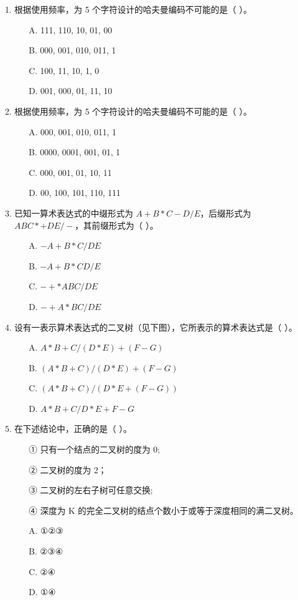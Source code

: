 \documentclass[12pt, a4paper]{article}
\begin{document}
\begin{enumerate}
    \item 根据使用频率，为 5 个字符设计的哈夫曼编码不可能的是（ ）。
    \begin{enumerate}
        \item[A.] 111, 110, 10, 01, 00
        \item[B.] 000, 001, 010, 011, 1
        \item[C.] 100, 11, 10, 1, 0
        \item[D.] 001, 000, 01, 11, 10
    \end{enumerate}
    
    \item 根据使用频率，为 5 个字符设计的哈夫曼编码不可能的是（ ）。
    \begin{enumerate}
        \item[A.] 000, 001, 010, 011, 1
        \item[B.] 0000, 0001, 001, 01, 1
        \item[C.] 000, 001, 01, 10, 11
        \item[D.] 00, 100, 101, 110, 111
    \end{enumerate}
    
    \item 已知一算术表达式的中缀形式为 $A+B*C-D/E$，后缀形式为 $ABC*+DE/-$，其前缀形式为（ ）。
    \begin{enumerate}
        \item[A.] $-A+B*C/DE$
        \item[B.] $-A+B*CD/E$
        \item[C.] $-+*ABC/DE$
        \item[D.] $-+A*BC/DE$
    \end{enumerate}
    
    \item 设有一表示算术表达式的二叉树（见下图），它所表示的算术表达式是（ ）。
    \begin{enumerate}
        \item[A.] $A*B+C/(D*E)+(F-G)$
        \item[B.] $(A*B+C)/(D*E)+(F-G)$
        \item[C.] $(A*B+C)/(D*E+(F-G))$
        \item[D.] $A*B+C/D*E+F-G$
    \end{enumerate}
    
    \item 在下述结论中，正确的是（ ）。
    \begin{enumerate}
        \item[①] 只有一个结点的二叉树的度为 0;
        \item[②] 二叉树的度为 2；
        \item[③] 二叉树的左右子树可任意交换;
        \item[④] 深度为 K 的完全二叉树的结点个数小于或等于深度相同的满二叉树。
        \item[A.] ①②③
        \item[B.] ②③④
        \item[C.] ②④
        \item[D.] ①④
    \end{enumerate}
    

\end{enumerate}
\end{document}
